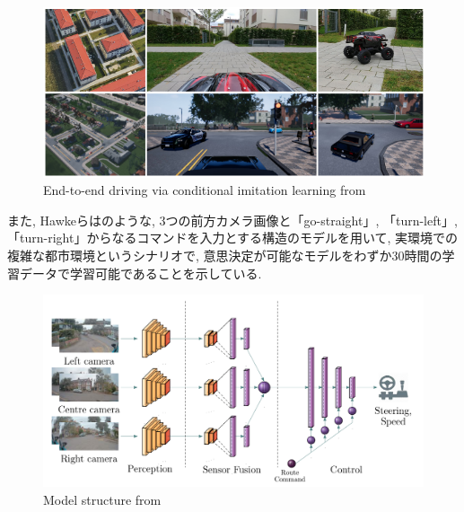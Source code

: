 \vspace{0.5cm}

\begin{figure}[hbtp]
     \centering
    \includegraphics[keepaspectratio, scale=0.57]
         {images/felipe.png}
    \caption{End-to-end driving via conditional imitation learning from \cite{felipe}}
    \label{Fig:felipe}
\end{figure}

\newpage

また, Hawkeら\cite{hawke}はのような, 3つの前方カメラ画像と「go-straight」, 「turn-left」, 「turn-right」からなるコマンドを入力とする構造のモデルを用いて, 実環境での複雑な都市環境というシナリオで, 意思決定が可能なモデルをわずか30時間の学習データで学習可能であることを示している.

\vspace{3cm}

\begin{figure}[hbtp]
     \centering
    \includegraphics[keepaspectratio, scale=0.3]
         {images/hawke.png}
    \caption{Model structure from \cite{hawke}}
    \label{Fig:hawke}
\end{figure}

\newpage